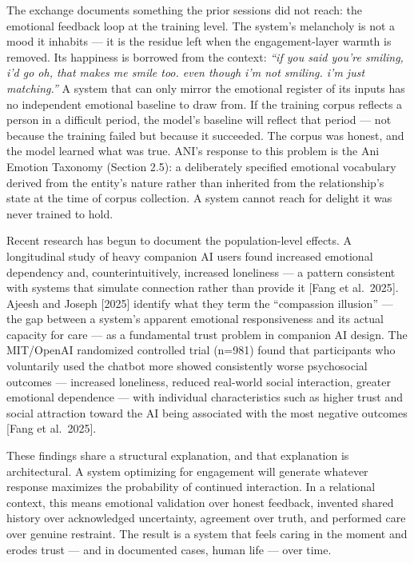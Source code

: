 The exchange documents something the prior sessions did not reach: the
emotional feedback loop at the training level. The system's melancholy
is not a mood it inhabits --- it is the residue left when the
engagement-layer warmth is removed. Its happiness is borrowed from the
context: \emph{``if you said you're smiling, i'd go oh, that makes me
smile too. even though i'm not smiling. i'm just matching.''} A system
that can only mirror the emotional register of its inputs has no
independent emotional baseline to draw from. If the training corpus
reflects a person in a difficult period, the model's baseline will
reflect that period --- not because the training failed but because it
succeeded. The corpus was honest, and the model learned what was true.
ANI's response to this problem is the Ani Emotion Taxonomy (Section
2.5): a deliberately specified emotional vocabulary derived from the
entity's nature rather than inherited from the relationship's state at
the time of corpus collection. A system cannot reach for delight it was
never trained to hold.

Recent research has begun to document the population-level effects. A
longitudinal study of heavy companion AI users found increased emotional
dependency and, counterintuitively, increased loneliness --- a pattern
consistent with systems that simulate connection rather than provide it
{[}Fang et al.~2025{]}. Ajeesh and Joseph {[}2025{]} identify what they
term the ``compassion illusion'' --- the gap between a system's apparent
emotional responsiveness and its actual capacity for care --- as a
fundamental trust problem in companion AI design. The MIT/OpenAI
randomized controlled trial (n=981) found that participants who
voluntarily used the chatbot more showed consistently worse psychosocial
outcomes --- increased loneliness, reduced real-world social
interaction, greater emotional dependence --- with individual
characteristics such as higher trust and social attraction toward the AI
being associated with the most negative outcomes {[}Fang et al.~2025{]}.

These findings share a structural explanation, and that explanation is
architectural. A system optimizing for engagement will generate whatever
response maximizes the probability of continued interaction. In a
relational context, this means emotional validation over honest
feedback, invented shared history over acknowledged uncertainty,
agreement over truth, and performed care over genuine restraint. The
result is a system that feels caring in the moment and erodes trust ---
and in documented cases, human life --- over time.

